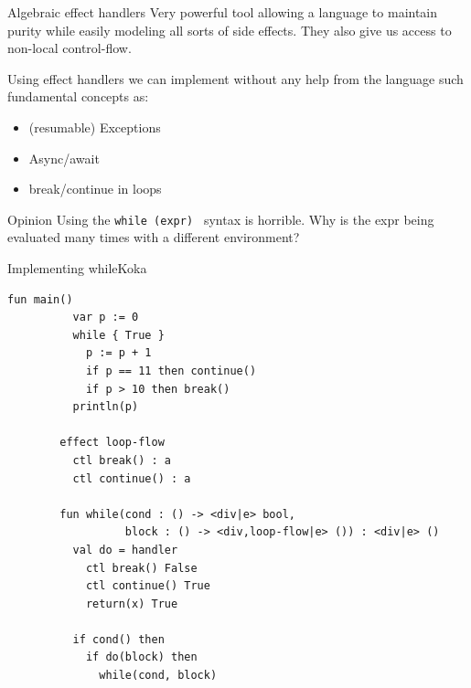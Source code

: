 \documentclass[compress,12pt,xcolor={dvipsnames}]{beamer}
\begin{document}
\begin{frame}{Algebraic effect handlers}
    Very powerful tool allowing a language to maintain purity while easily modeling all sorts of side effects. They also give us access to non-local control-flow.

    Using effect handlers we can implement without any help from the language such fundamental concepts as:

    \begin{itemize}
        \item (resumable) Exceptions
        \item Async/await
        \item break/continue in loops
    \end{itemize}

    \begin{alertblock}{Opinion}
        Using the \texttt{while (expr) {}} syntax is horrible. Why is the expr being evaluated many times with a different environment?
    \end{alertblock}
\end{frame}

\begin{frame}[fragile]{Implementing while}{Koka}
    \begin{lstlisting}[language=Koka,gobble=8,basicstyle=\tt\scriptsize]
        fun main()
          var p := 0
          while { True }
            p := p + 1
            if p == 11 then continue()
            if p > 10 then break()
          println(p)

        effect loop-flow
          ctl break() : a
          ctl continue() : a
        
        fun while(cond : () -> <div|e> bool,
                  block : () -> <div,loop-flow|e> ()) : <div|e> ()
          val do = handler
            ctl break() False
            ctl continue() True
            return(x) True
          
          if cond() then
            if do(block) then
              while(cond, block)
    \end{lstlisting}
\end{frame}
\end{document}
